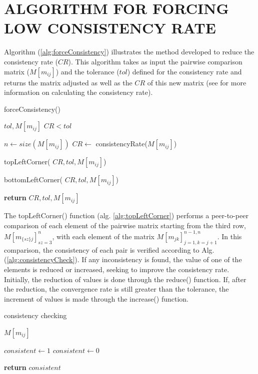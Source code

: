 \documentclass[10pt,fleqn,a4paper,twoside]{article}
\begin{document}
    \section{ALGORITHM FOR FORCING LOW CONSISTENCY RATE}
    
    Algorithm (\ref{alg:forceConsistency}) illustrates the method developed to reduce the consistency rate ($CR$). This algorithm takes as input the pairwise comparison matrix ($M[m_{ij}]$) and the tolerance ($tol$) defined for the consistency rate and returns the matrix adjusted as well as the $CR$ of this new matrix (see \cite{Saaty1987} for more information on calculating the consistency rate).
    
\begin{algorithm}
\caption{forceConsistency()}\label{alg:forceConsistency}
	\begin{algorithmic}
	\Require $tol, M[m_{ij}]$
	\Ensure $CR < tol$
		
	\State $n \gets size(M[m_{ij}])$
	\State $CR \gets$ consistencyRate($M[m_{ij}]$)
	
	\State topLeftCorner( $CR, tol, M[m_{ij}]$)
	
	\State bottomLeftCorner( $CR, tol, M[m_{ij}]$)
	
	\State \textbf{return} $CR, tol, M[m_{ij}]$
	
\end{algorithmic}
\end{algorithm}

The topLeftCorner() function (alg. \ref{alg:topLeftCorner}) performs a peer-to-peer comparison of each element of the pairwise matrix starting from the third row, $M[m_{\{sz\}j}]_{sz=3}^{n}$, with each element of the matrix $M[m_{jk}]_{j=1, k=j+1}^{n-1,n}$. In this comparison, the consistency of each pair is verified according to Alg. (\ref{alg:consistencyCheck}). If any inconsistency is found, the value of one of the elements is reduced or increased, seeking to improve the consistency rate. Initially, the reduction of values is done through the reduce() function.  If, after the reduction, the convergence rate is still greater than the tolerance, the increment of values is made through the increase() function.

\begin{algorithm}
\caption{consistency checking}\label{alg:consistencyCheck}
	\begin{algorithmic}
	\Require $M[m_{ij}]$
	
		\State $consistent \gets 1$ 
	\Else
		\State $consistent \gets 0$ 
	\EndIf
	
	\State \textbf{return} $consistent$
	
\end{algorithmic}
\end{algorithm}
\end{document}
